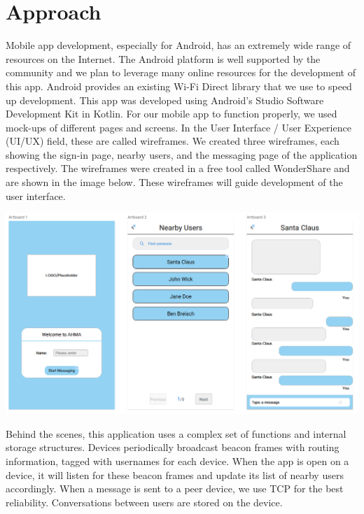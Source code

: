\documentclass[10pt]{article}
\begin{document}
\section{Approach} %
Mobile app development, especially for Android, has an extremely wide range of resources on the Internet. The Android platform is well supported by the community and we plan to leverage many online resources for the development of this app. Android provides an existing Wi-Fi Direct library that we use to speed up development. This app was developed using Android's Studio Software Development Kit in Kotlin. For our mobile app to function properly, we used mock-ups of different pages and screens. In the User Interface / User Experience (UI/UX) field, these are called wireframes. We created three wireframes, each showing the sign-in page, nearby users, and the messaging page of the application respectively. The wireframes were created in a free tool called WonderShare and are shown in the image below. These wireframes will guide development of the user interface.\\
\begin{center}
    \includegraphics[scale=0.5]{wireframe.png} \\
\end{center}
Behind the scenes, this application uses a complex set of functions and internal storage structures. Devices  periodically broadcast beacon frames with routing information, tagged with usernames for each device. When the app is open on a device, it will listen for these beacon frames and update its list of nearby users accordingly. When a message is sent to a peer device, we use TCP for the best reliability. Conversations between users are stored on the device.
\end{document}
